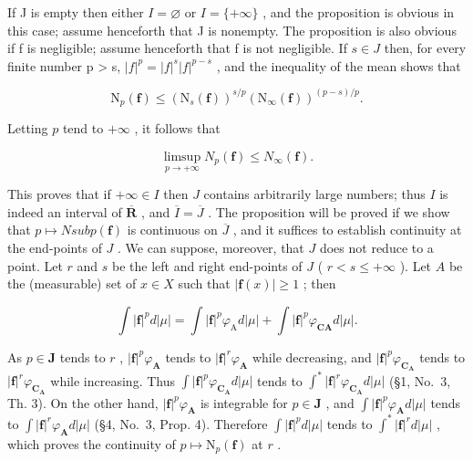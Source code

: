 If J is empty then either \(I = \varnothing\) or \(I = \{+\infty\}\) , and the proposition is obvious in this case; assume henceforth that J is nonempty. The proposition is also obvious if f is negligible; assume henceforth that f is not negligible. If \(s \in J\) then, for every finite number p \textgreater{} s, \(|f|^{p} = |f|^{s}|f|^{p-s}\) , and the inequality of the mean shows that

\[
\mathrm{N} _ {p} (\mathbf {f}) \leqslant \left(\mathrm{N} _ {s} (\mathbf {f})\right) ^ {s / p} \left(\mathrm{N} _ {\infty} (\mathbf {f})\right) ^ {(p - s) / p}.\tag{12}
\]

Letting \(p\) tend to \(+\infty\) , it follows that

\[
\limsup _ {p \to + \infty} N _ {p} (\mathbf {f}) \leqslant N _ {\infty} (\mathbf {f})  .\tag{13}
\]

This proves that if \(+\infty \in I\) then \(J\) contains arbitrarily large numbers; thus \(I\) is indeed an interval of \(\overline{\mathbf{R}}\) , and \(\overline{I} = \overline{J}\) . The proposition will be proved if we show that \(p \mapsto N sub p(\mathbf{f})\) is continuous on \(\overline{J}\) , and it suffices to establish continuity at the end-points of \(J\) . We can suppose, moreover, that \(J\) does not reduce to a point. Let \(r\) and \(s\) be the left and right end-points of \(J\) ( \(r < s \leqslant +\infty\) ). Let \(A\) be the (measurable) set of \(x \in X\) such that \(|\mathbf{f}(x)| \geqslant 1\) ; then

\[
\int | \mathbf {f} | ^ {p} d | \mu | = \int | \mathbf {f} | ^ {p} \varphi_ {\mathrm{A}} d | \mu | + \int | \mathbf {f} | ^ {p} \varphi_ {\mathbf {C A}} d | \mu |.
\]

As \(p \in \mathbf{J}\) tends to \(r\) , \(|\mathbf{f}|^p\varphi_{\mathbf{A}}\) tends to \(|\mathbf{f}|^r\varphi_{\mathbf{A}}\) while decreasing, and \(|\mathbf{f}|^p\varphi_{\mathbf{C}_{\mathbf{A}}}\) tends to \(|\mathbf{f}|^r\varphi_{\mathbf{C}_{\mathbf{A}}}\) while increasing. Thus \(\int |\mathbf{f}|^p\varphi_{\mathbf{C}_{\mathbf{A}}}d|\mu|\) tends to \(\int^{*}|\mathbf{f}|^{r}\varphi_{\mathbf{C}_{\mathbf{A}}}d|\mu|\) (§1, No.~3, Th. 3). On the other hand, \(|\mathbf{f}|^p\varphi_{\mathbf{A}}\) is integrable for \(p \in \mathbf{J}\) , and \(\int |\mathbf{f}|^p\varphi_{\mathbf{A}}d|\mu|\) tends to \(\int |\mathbf{f}|^r\varphi_{\mathbf{A}}d|\mu|\) (§4, No.~3, Prop. 4). Therefore \(\int |\mathbf{f}|^p d|\mu|\) tends to \(\int^{*}|\mathbf{f}|^{r}d|\mu|\) , which proves the continuity of \(p \mapsto \mathrm{N}_p(\mathbf{f})\) at \(r\) .

